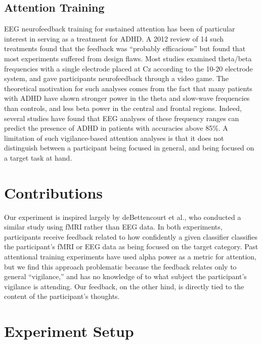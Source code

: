 \documentclass[11pt]{report}
\begin{document}
\subsection{Attention Training}
	EEG neurofeedback training for sustained attention has been of particular interest in serving as a treatment for ADHD.  A 2012 review\cite{Lofthouse} of 14 such treatments found that the feedback was ``probably efficacious'' but found that most experiments suffered from design flaws.  Most studies examined theta/beta frequencies with a single electrode placed at Cz according to the 10-20 electrode system, and gave participants neurofeedback through a video game.  The theoretical motivation for such analyses comes from the fact that many patients with ADHD have shown stronger power in the theta and slow-wave frequencies than controls, and less beta power in the central and frontal regions.  Indeed, several studies\cite{Barry} have found that EEG analyses of these frequency ranges can predict the presence of ADHD in patients with accuracies above 85\%.  A limitation of such vigilance-based attention analyses is that it does not distinguish between a participant being focused in general, and being focused on a target task at hand.

\section{Contributions}
Our experiment is inspired largely by deBettencourt et al.\cite{deBettencourt}, who conducted a similar study using fMRI rather than EEG data.  In both experiments, participants receive feedback related to how confidently a given classifier classifies the participant’s fMRI or EEG data as being focused on the target category.  Past attentional training experiments have used alpha power as a metric for attention, but we find this approach problematic because the feedback relates only to general “vigilance,” and has no knowledge of to what subject the participant’s vigilance is attending.  Our feedback, on the other hind, is directly tied to the content of the participant’s thoughts.

\section{Experiment Setup}
\end{document}

